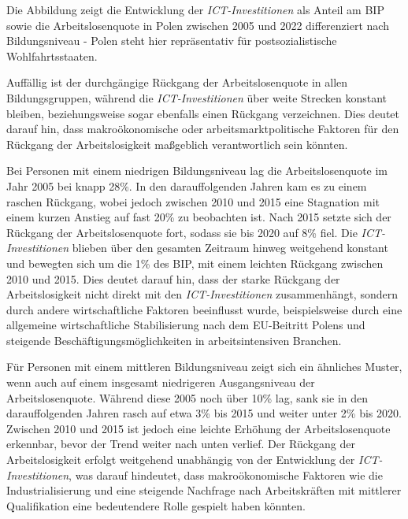 Die Abbildung zeigt die Entwicklung der \textit{\ac{ICT}-Investitionen} als Anteil 
am BIP sowie die Arbeitslosenquote in Polen zwischen 2005 und 2022 differenziert 
nach Bildungsniveau - Polen steht hier repräsentativ für postsozialistische 
Wohlfahrtsstaaten.

Auffällig ist der durchgängige Rückgang der Arbeitslosenquote in allen 
Bildungsgruppen, während die \textit{\ac{ICT}-Investitionen} über weite Strecken 
konstant bleiben, beziehungsweise sogar ebenfalls einen Rückgang verzeichnen. Dies 
deutet darauf hin, dass makroökonomische oder arbeitsmarktpolitische Faktoren für 
den Rückgang der Arbeitslosigkeit maßgeblich verantwortlich sein könnten.

Bei Personen mit einem niedrigen Bildungsniveau lag die Arbeitslosenquote im Jahr 
2005 bei knapp 28\%. In den darauffolgenden Jahren kam es zu einem raschen Rückgang, 
wobei jedoch zwischen 2010 und 2015 eine Stagnation mit einem kurzen Anstieg auf fast 
20\% zu beobachten ist. Nach 2015 setzte sich der Rückgang der Arbeitslosenquote 
fort, sodass sie bis 2020 auf 8\% fiel. Die \textit{\ac{ICT}-Investitionen} blieben 
über den gesamten Zeitraum hinweg weitgehend konstant und bewegten sich um die 1\% des 
BIP, mit einem leichten Rückgang zwischen 2010 und 2015. Dies deutet darauf hin, dass  
der starke Rückgang der Arbeitslosigkeit nicht direkt mit den 
\textit{\ac{ICT}-Investitionen} zusammenhängt, sondern durch andere wirtschaftliche 
Faktoren beeinflusst wurde, beispielsweise durch eine allgemeine wirtschaftliche 
Stabilisierung nach dem EU-Beitritt Polens und steigende Beschäftigungsmöglichkeiten 
in arbeitsintensiven Branchen.

Für Personen mit einem mittleren Bildungsniveau zeigt sich ein ähnliches Muster, wenn 
auch auf einem insgesamt niedrigeren Ausgangsniveau der Arbeitslosenquote. Während 
diese 2005 noch über 10\% lag, sank sie in den darauffolgenden Jahren rasch auf etwa 
3\% bis 2015 und weiter unter 2\% bis 2020. Zwischen 2010 und 2015 ist jedoch eine 
leichte Erhöhung der Arbeitslosenquote erkennbar, bevor der Trend weiter nach unten 
verlief. Der Rückgang der Arbeitslosigkeit erfolgt weitgehend unabhängig von der 
Entwicklung der \textit{\ac{ICT}-Investitionen}, was darauf hindeutet, dass 
makroökonomische Faktoren wie die Industrialisierung und eine steigende Nachfrage 
nach Arbeitskräften mit mittlerer Qualifikation eine bedeutendere Rolle gespielt 
haben könnten.

